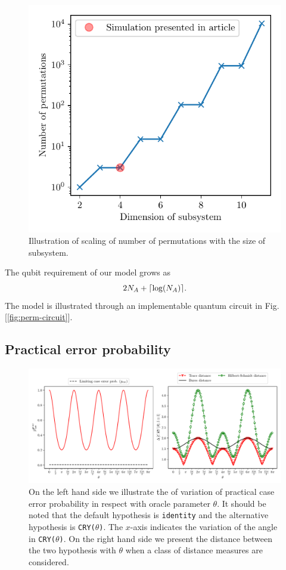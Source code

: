 \begin{figure}[tbh!]
    \centering
    \includegraphics[width = 0.5\linewidth]{plot/numb_of_perm}
    \caption{Illustration of scaling of number of permutations with the size of subsystem.}
    \label{fig:permutation-resource}
\end{figure}
The qubit requirement of our model grows as
\begin{equation}
    2N_A + \lceil\log( N_A )\rceil. 
\end{equation}
The model is illustrated through an implementable quantum circuit in Fig.[\ref{fig:perm-circuit}].
\subsection{ Practical error probability}


\begin{figure}
\centering
\includegraphics[width = \linewidth]{plot/limiting_error_prob.pdf}
\caption{On the left hand side we illustrate the of variation of practical case error probability in respect with oracle parameter $\theta$. It should be noted that the default hypothesis is \texttt{identity} and the alternative hypothesis is \texttt{CRY($\theta$)}. The $x$-axis indicates the variation of the angle in \texttt{CRY($\theta$)}. On the right hand side we present the distance between the two hypothesis with $\theta$ when a class of distance measures are considered.}
\label{fig:practical-case-error-plot}
\end{figure}

